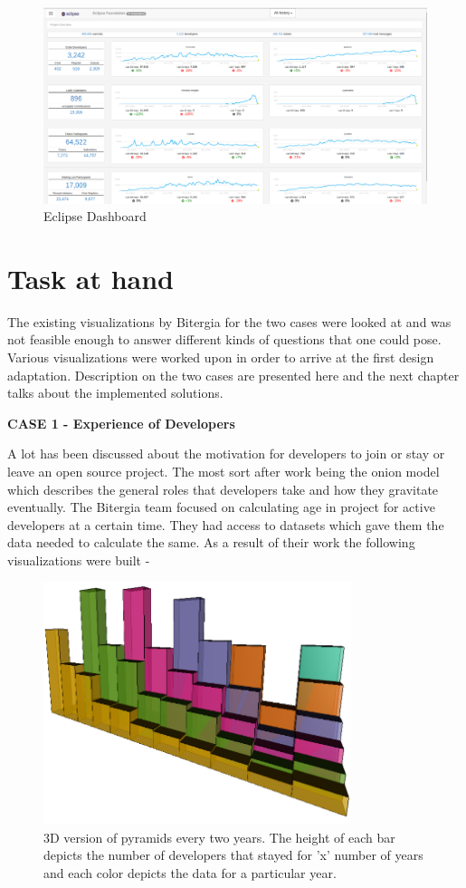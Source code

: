 \documentclass[seploa]{beavtex}
\begin{document}
\begin{figure}[H]
\centering
\includegraphics[width=120mm]{eclipse.png}
\caption{Eclipse Dashboard}
\end{figure}

\section{Task at hand}
The existing visualizations by Bitergia for the two cases were looked at and was not feasible enough to answer different kinds of questions that one could pose. Various visualizations were worked upon in order to arrive at the first design adaptation. Description on the two cases are presented here and the next chapter talks about the implemented solutions.

\textbf{CASE 1 - Experience of Developers}

A lot has been discussed about the motivation for developers to join or stay or leave an open source project. The most sort after work being the onion model which describes the general roles that developers take and how they gravitate eventually\cite{crowston2005,  kishida2003}. The Bitergia team focused on calculating age in project for active developers at a certain time. They had access to datasets which gave them the data needed to calculate the same. As a result of their work the following visualizations were built - 

\begin{figure}[!ht]
\centering
\includegraphics[width=90mm]{age2.png}
\caption{3D version of pyramids every two years. The height of each bar depicts the number of developers that stayed for 'x' number of years and each color depicts the data for a particular year.}
\end{figure}
\end{document}
